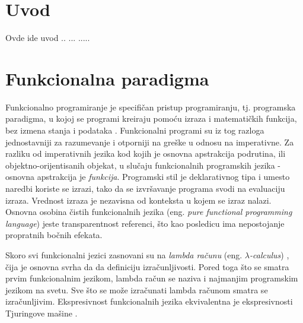 \documentclass[12pt,oneside]{memoir}
\begin{document}
\frontmatter
\naslovna
\komisija
\apstrakt
\tableofcontents*

\mainmatter

\chapter{Uvod}

Ovde ide uvod .. ... ..... 

\chapter{Funkcionalna paradigma}
\label{chp:uvodnideo}

\par Funkcionalno programiranje je specifičan pristup programiranju, tj. programska paradigma, u kojoj se programi kreiraju pomoću izraza i matematičkih funkcija, bez izmena stanja i podataka \cite{func}. Funkcionalni programi su iz tog razloga jednostavniji za razumevanje i otporniji na greške u odnosu na imperativne. Za razliku od imperativnih jezika kod kojih je osnovna apstrakcija podrutina, ili objektno-orijentisanih objekat, u slučaju funkcionalnih programskih jezika - osnovna apstrakcija je \textit{funkcija}. Programski stil je deklarativnog tipa i umesto naredbi koriste se izrazi, tako da se izvršavanje programa svodi na evaluaciju izraza. Vrednost izraza je nezavisna od konteksta u kojem se izraz nalazi. Osnovna osobina čistih funkcionalnih jezika (eng. \textit{pure functional programming language}) jeste transparentnost referenci, što kao posledicu ima nepostojanje propratnih bočnih efekata.
\par Skoro svi funkcionalni jezici zasnovani su na \textit{lambda računu} (eng. \textit{ $\lambda$-calculus}) , čija je osnovna svrha da da definiciju izračunljivosti. Pored toga što se smatra prvim funkcionalnim jezikom, lambda račun se naziva i najmanjim programskim jezikom na svetu. Sve što se može izračunati lambda računom smatra se izračunljivim. Ekspresivnost funkcionalnih jezika ekvivalentna je ekspresivnosti Tjuringove mašine \cite{turing}. 
\end{document}
